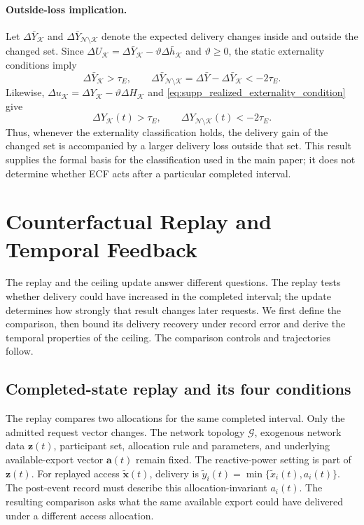 \documentclass[11pt]{article}
\begin{document}
\paragraph{Outside-loss implication.}
Let $\Delta\bar Y_{\mathcal K}$ and
$\Delta\bar Y_{\mathcal N\setminus\mathcal K}$ denote the expected delivery
changes inside and outside the changed set. Since
$\Delta U_{\mathcal K}=\Delta\bar Y_{\mathcal K}
-\vartheta\Delta\bar h_{\mathcal K}$ and $\vartheta\ge0$, the static
externality conditions imply
\begin{equation}
\Delta\bar Y_{\mathcal K}>\tau_E,
\qquad
\Delta\bar Y_{\mathcal N\setminus\mathcal K}
=\Delta\bar Y-\Delta\bar Y_{\mathcal K}<-2\tau_E.
\label{eq:supp_expected_outside_loss_bound}
\end{equation}
Likewise,
$\Delta u_{\mathcal K}=\Delta Y_{\mathcal K}
-\vartheta\Delta H_{\mathcal K}$ and
\eqref{eq:supp_realized_externality_condition} give
\begin{equation}
\Delta Y_{\mathcal K}(t)>\tau_E,
\qquad
\Delta Y_{\mathcal N\setminus\mathcal K}(t)<-2\tau_E.
\label{eq:supp_realized_outside_loss_bound}
\end{equation}
Thus, whenever the externality classification holds, the delivery gain of the
changed set is accompanied by a larger delivery loss outside that set. This
result supplies the formal basis for the classification used in the main paper;
it does not determine whether ECF acts after a particular completed interval.

\section{Counterfactual Replay and Temporal Feedback}
\label{supp:temporal_recursion}

The replay and the ceiling update answer different questions. The replay tests
whether delivery could have increased in the completed interval; the update determines how
strongly that result changes later requests. We first define the comparison,
then bound its delivery recovery under record error and derive the temporal
properties of the ceiling. The comparison controls and trajectories follow.

\subsection{Completed-state replay and its four conditions}

The replay compares two allocations for the same completed interval. Only the
admitted request vector changes. The network topology $\mathcal G$, exogenous
network data $\mathbf z(t)$, participant set, allocation rule and parameters,
and underlying available-export vector $\mathbf a(t)$ remain fixed. The
reactive-power setting is part of $\mathbf z(t)$. For replayed access
$\widetilde{\mathbf x}(t)$, delivery is
$\widetilde y_i(t)=\min\{\widetilde x_i(t),a_i(t)\}$. The post-event record must describe
this allocation-invariant $a_i(t)$. The resulting comparison asks what the same
available export could have delivered under a different access allocation.
\end{document}
